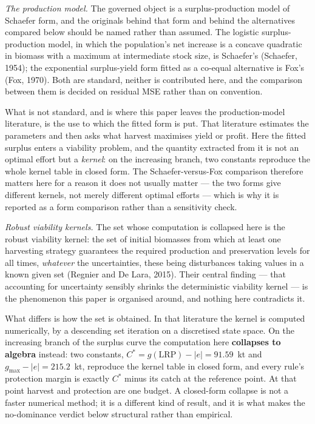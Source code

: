 \textit{The production model.} The governed object is a surplus-production model of Schaefer
form, and the originals behind that form and behind the alternatives compared below should be
named rather than assumed. The logistic surplus-production model, in which the population's net
increase is a concave quadratic in biomass with a maximum at intermediate stock size, is
Schaefer's (Schaefer, 1954); the exponential surplus-yield form fitted as a co-equal
alternative is Fox's (Fox, 1970). Both are standard, neither is contributed here, and the
comparison between them is decided on residual MSE rather than on convention.

What is not standard, and is where this paper leaves the production-model literature, is the use
to which the fitted form is put. That literature estimates the parameters and then asks what
harvest maximises yield or profit. Here the fitted surplus enters a viability problem, and the
quantity extracted from it is not an optimal effort but a \emph{kernel}: on the increasing
branch, two constants reproduce the whole kernel table in closed form. The Schaefer-versus-Fox
comparison therefore matters here for a reason it does not usually matter --- the two forms give
different kernels, not merely different optimal efforts --- which is why it is reported as a
form comparison rather than a sensitivity check.

\textit{Robust viability kernels.} The set whose computation is collapsed here is the robust
viability kernel: the set of initial biomasses from which at least one harvesting strategy
guarantees the required production and preservation levels for all times, \emph{whatever} the
uncertainties, these being disturbances taking values in a known given set (Regnier and De
Lara, 2015). Their central finding --- that accounting for uncertainty sensibly shrinks the
deterministic viability kernel --- is the phenomenon this paper is organised around, and
nothing here contradicts it.

What differs is how the set is obtained. In that literature the kernel is computed
numerically, by a descending set iteration on a discretised state space. On the increasing
branch of the surplus curve the computation here \textbf{collapses to algebra} instead: two
constants, $C^{*} = g(\mathrm{LRP}) - |e| = 91.59$~kt and $g_{\max} - |e| = 215.2$~kt,
reproduce the kernel table in closed form, and every rule's protection margin is exactly
$C^{*}$ minus its catch at the reference point. At that point harvest and protection are one
budget. A closed-form collapse is not a faster numerical method; it is a different kind of
result, and it is what makes the no-dominance verdict below structural rather than empirical.

